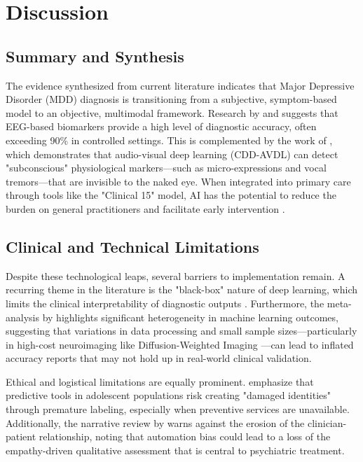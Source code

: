 \documentclass[12pt]{article}
\begin{document}
\newpage
\section{Discussion}

\subsection{Summary and Synthesis}
The evidence synthesized from current literature indicates that Major Depressive Disorder (MDD) diagnosis is transitioning from a subjective, symptom-based model to an objective, multimodal framework. Research by \citet{ahire2025} and \citet{boby2025} suggests that EEG-based biomarkers provide a high level of diagnostic accuracy, often exceeding 90\% in controlled settings. This is complemented by the work of \citet{liu2025}, which demonstrates that audio-visual deep learning (CDD-AVDL) can detect "subconscious" physiological markers—such as micro-expressions and vocal tremors—that are invisible to the naked eye. When integrated into primary care through tools like the "Clinical 15" model, AI has the potential to reduce the burden on general practitioners and facilitate early intervention \citep{eder2026}.

\subsection{Clinical and Technical Limitations}
Despite these technological leaps, several barriers to implementation remain. A recurring theme in the literature is the "black-box" nature of deep learning, which limits the clinical interpretability of diagnostic outputs \citep{ahire2025, weber2025}. Furthermore, the meta-analysis by \citet{lee2020corrigendum} highlights significant heterogeneity in machine learning outcomes, suggesting that variations in data processing and small sample sizes—particularly in high-cost neuroimaging like Diffusion-Weighted Imaging \citep{sacchet2015}—can lead to inflated accuracy reports that may not hold up in real-world clinical validation.

Ethical and logistical limitations are equally prominent. \citet{kohrt2025} emphasize that predictive tools in adolescent populations risk creating "damaged identities" through premature labeling, especially when preventive services are unavailable. Additionally, the narrative review by \citet{ricci2025} warns against the erosion of the clinician-patient relationship, noting that automation bias could lead to a loss of the empathy-driven qualitative assessment that is central to psychiatric treatment.
\end{document}
